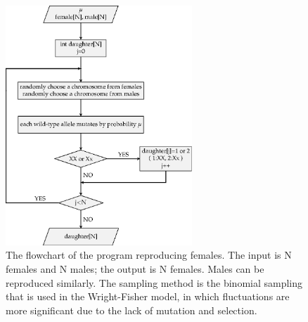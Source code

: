 \documentclass[referee,sn-basic]{sn-jnl}%
\theoremstyle{thmstyleone}%
\theoremstyle{thmstyletwo}%
\theoremstyle{thmstylethree}%
\begin{document}
\begin{appendices}
\begin{figure}
\includegraphics[width=7cm]{FigA2.eps} 
\caption{ 
The flowchart of the program reproducing females. The input is N females and N males; the output is N females. 
Males can be reproduced similarly. The sampling method is the binomial sampling that is used in the Wright-Fisher model, in which fluctuations are more significant due to the lack of mutation and selection.  
}\label{males}
\end{figure}

\end{appendices}


\end{document}
